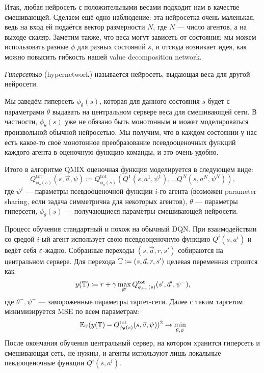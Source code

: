 Итак, любая нейросеть с положительными весами подходит нам в качестве смешивающей. Сделаем ещё одно наблюдение: эта нейросетка очень маленькая, ведь на вход ей подаётся вектор размерности $N$, где $N$ --- число агентов, а на выходе скаляр. Заметим также, что веса могут зависеть от состояния: мы можем использовать разные $\phi$ для разных состояний $s$, и отсюда возникает идея, как можно повысить гибкость нашей value decomposition network.

\begin{definition}
\emph{Гиперсетью} (hypernetwork) называется нейросеть, выдающая веса для другой нейросети.
\end{definition}

Мы заведём гиперсеть $\phi_{\theta}(s)$, которая для данного состояния $s$ будет с параметрами $\theta$ выдавать на центральном сервере веса для смешивающей сети. В частности, $\phi_{\theta}(s)$ уже не обязано быть монотонным и может моделироваться произвольной обычной нейросетью. Мы получим, что в каждом состоянии у нас есть какое-то своё монотонное преобразование псевдооценочных функций каждого агента в оценочную функцию команды, и это очень удобно.

Итого в алгоритме QMIX оценочная функция моделируется в следующем виде:
$$Q^{\mathrm{tot}}_{\phi_{\theta}(s)}(s, \vec{a}, \psi) \coloneqq Q^{\mathrm{tot}}_{\phi_{\theta}(s)}( Q^1(s, a^1, \psi^1), \dots Q^N(s, a^N, \psi^N)),$$
где $\psi^i$ --- параметры псевдооценочной функции $i$-го агента (возможен parameter sharing, если задача симметрична для некоторых агентов), $\theta$ --- параметры гиперсети, $\phi_{\theta}(s)$ --- получающиеся параметры смешивающей нейросети.

Процесс обучения стандартный и похож на обычный DQN. При взаимодействии со средой $i$-ый агент использует свою псевдооценочную функцию $Q^i(s, a^i)$ и ведёт себя $\varepsilon$-жадно. Собранные переходы $(s, \vec{a}, r, s')$ собираются на центральном сервере. Для перехода $\mathbb{T} \coloneqq (s, \vec{a}, r, s')$ целевая переменная строится как 
$$y(\mathbb{T}) \coloneqq r + \gamma \max_{\vec{a}'} Q^{\mathrm{tot}}_{\phi_{\theta^-}(s)}(s', \vec{a}', \psi^-),$$
где $\theta^-, \psi^-$ --- замороженные параметры таргет-сети. Далее с таким таргетом минимизируется MSE по всем параметрам:
$$\mathbb{E}_{\mathbb{T}} (y(\mathbb{T}) - Q^{\mathrm{tot}}_{\phi_{\theta}(s)}(s, \vec{a}, \psi))^2 \to \min_{\theta, \psi}$$
После окончания обучения центральный сервер, на котором хранится гиперсеть и смешивающая сеть, не нужны, и агенты используют лишь локальные певдооценочные функции $Q^i(s, a^i)$.

